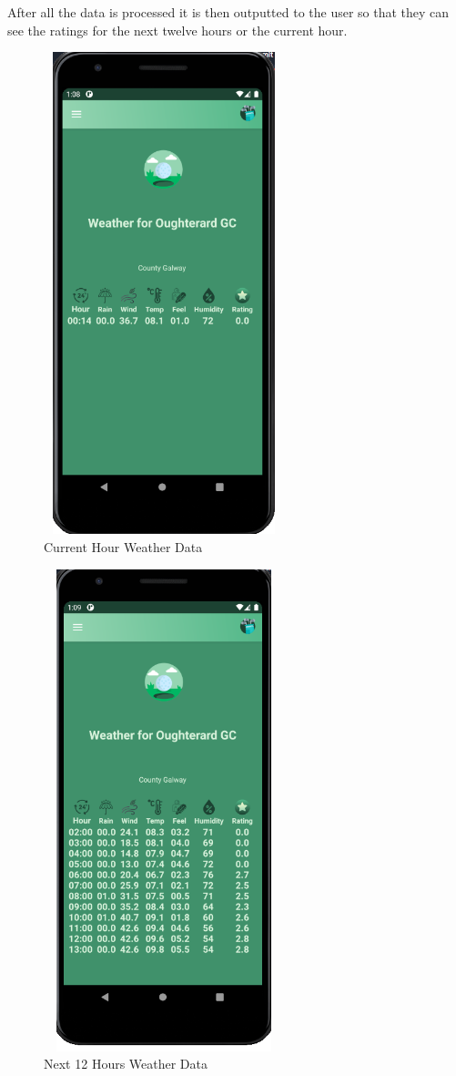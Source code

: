 After all the data is processed it is then outputted to the user so that they can see the ratings for the next twelve hours or the current hour.

\begin{figure}[H]
    \centering
    \includegraphics[width=7cm,height = 14cm]{img/CurrentDataOutput.PNG}
    \caption{Current Hour Weather Data}
    \label{fig:Current Hour Weather Data}
\end{figure}

\begin{figure}[H]
    \centering
    \includegraphics[width=7cm,height = 14cm]{img/HourlyDataOutput.PNG}
    \caption{ Next 12 Hours Weather Data}
    \label{fig:Next 12 Hours Weather Data}
\end{figure}


